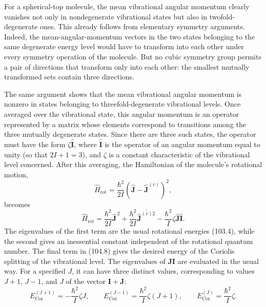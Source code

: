 For a spherical-top molecule, the mean vibrational angular momentum clearly vanishes not only in nondegenerate vibrational states but also in twofold-degenerate ones. This already follows from elementary symmetry arguments. Indeed, the mean-angular-momentum vectors in the two states belonging to the same degenerate energy level would have to transform into each other under every symmetry operation of the molecule. But no cubic symmetry group permits a pair of directions that transform only into each other: the smallest mutually transformed sets contain three directions.

The same argument shows that the mean vibrational angular momentum is nonzero in states belonging to threefold-degenerate vibrational levels. Once averaged over the vibrational state, this angular momentum is an operator represented by a matrix whose elements correspond to transitions among the three mutually degenerate states. Since there are three such states, the operator must have the form $\zeta\widehat{\mathbf I}$, where $\widehat{\mathbf I}$ is the operator of an angular momentum equal to unity (so that $2I+1=3$), and $\zeta$ is a constant characteristic of the vibrational level concerned. After this averaging, the Hamiltonian of the molecule's rotational motion,
\[
 \widehat H_{\text{rot}}=\frac{\hbar^2}{2I}(\widehat{\mathbf J}-\widehat{\mathbf J}^{(v)})^2,
\]
becomes
\begin{equation}
 \widehat H_{\text{rot}}=\frac{\hbar^2}{2I}\widehat{\mathbf J}^{\,2}
 +\frac{\hbar^2}{2I}\overline{\widehat{\mathbf J}^{(v)2}}
 -\frac{\hbar^2}{I}\zeta\widehat{\mathbf J}\widehat{\mathbf I}.
 \tag{104.8}
\end{equation}
The eigenvalues of the first term are the usual rotational energies (103.4), while the second gives an inessential constant independent of the rotational quantum number. The final term in (104.8) gives the desired energy of the Coriolis splitting of the vibrational level. The eigenvalues of $\mathbf J\mathbf I$ are evaluated in the usual way. For a specified $J$, it can have three distinct values, corresponding to values $J+1$, $J-1$, and $J$ of the vector $\mathbf I+\mathbf J$:
\begin{equation}
 E_{\text{Cor}}^{(J+1)}=-\frac{\hbar^2}{I}\zeta J,\qquad
 E_{\text{Cor}}^{(J-1)}=\frac{\hbar^2}{I}\zeta(J+1),\qquad
 E_{\text{Cor}}^{(J)}=\frac{\hbar^2}{I}\zeta.
 \tag{104.9}
\end{equation}
